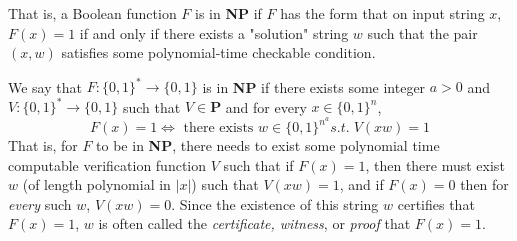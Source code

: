 \documentclass{article}
\begin{document}
  That is, a Boolean function $F$ is in \textbf{NP} if $F$ has the form that on input string $x$, $F(x) = 1$ if and only if there exists a "solution" string $w$ such that the pair $(x, w)$ satisfies some polynomial-time checkable condition. 

  \begin{definition}
  We say that $F: \{0,1\}^* \longrightarrow \{0,1\}$ is in \textbf{NP} if there exists some integer $a > 0$ and $V: \{0,1\}^* \longrightarrow \{0,1\}$ such that $V \in \mathbf{P}$ and for every $x \in \{0,1\}^n$, 
  \[F(x) = 1 \iff \text{ there exists } w \in \{0,1\}^{n^a} s.t. \; V(x w) = 1\]
  That is, for $F$ to be in \textbf{NP}, there needs to exist some polynomial time computable verification function $V$ such that if $F(x) = 1$, then there must exist $w$ (of length polynomial in $|x|$) such that $V(x w) = 1$, and if $F(x) = 0$ then for \textit{every} such $w$, $V(xw) = 0$. Since the existence of this string $w$ certifies that $F(x) = 1$, $w$ is often called the \textit{certificate, witness}, or \textit{proof} that $F(x) = 1$. 
  \end{definition}
\end{document}
